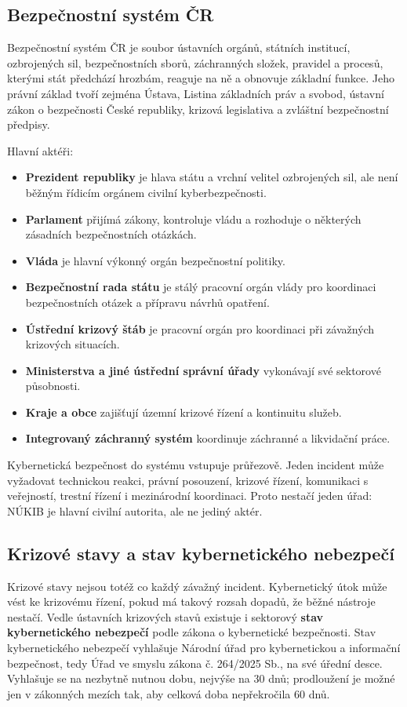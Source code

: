\documentclass[11pt,a4paper]{article}
\begin{document}
\subsection*{Bezpečnostní systém ČR}
Bezpečnostní systém ČR je soubor ústavních orgánů, státních institucí, ozbrojených sil, bezpečnostních sborů, záchranných složek, pravidel a procesů, kterými stát předchází hrozbám, reaguje na ně a obnovuje základní funkce. Jeho právní základ tvoří zejména Ústava, Listina základních práv a svobod, ústavní zákon o bezpečnosti České republiky, krizová legislativa a zvláštní bezpečnostní předpisy.

Hlavní aktéři:
\begin{itemize}
  \item \textbf{Prezident republiky} je hlava státu a vrchní velitel ozbrojených sil, ale není běžným řídicím orgánem civilní kyberbezpečnosti.
  \item \textbf{Parlament} přijímá zákony, kontroluje vládu a rozhoduje o některých zásadních bezpečnostních otázkách.
  \item \textbf{Vláda} je hlavní výkonný orgán bezpečnostní politiky.
  \item \textbf{Bezpečnostní rada státu} je stálý pracovní orgán vlády pro koordinaci bezpečnostních otázek a přípravu návrhů opatření.
  \item \textbf{Ústřední krizový štáb} je pracovní orgán pro koordinaci při závažných krizových situacích.
  \item \textbf{Ministerstva a jiné ústřední správní úřady} vykonávají své sektorové působnosti.
  \item \textbf{Kraje a obce} zajišťují územní krizové řízení a kontinuitu služeb.
  \item \textbf{Integrovaný záchranný systém} koordinuje záchranné a likvidační práce.
\end{itemize}

Kybernetická bezpečnost do systému vstupuje průřezově. Jeden incident může vyžadovat technickou reakci, právní posouzení, krizové řízení, komunikaci s veřejností, trestní řízení i mezinárodní koordinaci. Proto nestačí jeden úřad: NÚKIB je hlavní civilní autorita, ale ne jediný aktér.

\subsection*{Krizové stavy a stav kybernetického nebezpečí}
Krizové stavy nejsou totéž co každý závažný incident. Kybernetický útok může vést ke krizovému řízení, pokud má takový rozsah dopadů, že běžné nástroje nestačí. Vedle ústavních krizových stavů existuje i sektorový \textbf{stav kybernetického nebezpečí} podle zákona o kybernetické bezpečnosti. Stav kybernetického nebezpečí vyhlašuje Národní úřad pro kybernetickou a informační bezpečnost, tedy Úřad ve smyslu zákona č. 264/2025 Sb., na své úřední desce. Vyhlašuje se na nezbytně nutnou dobu, nejvýše na 30 dnů; prodloužení je možné jen v zákonných mezích tak, aby celková doba nepřekročila 60 dnů.
\end{document}
